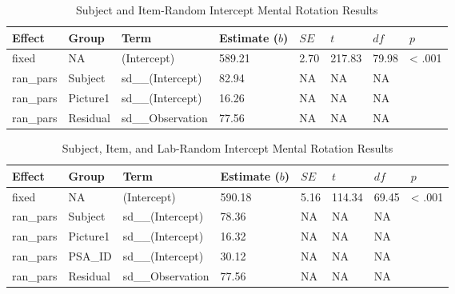 \documentclass[
  man,floatsintext]{apa7}
\begin{document}
\begin{table}[tbp]

\begin{center}
\begin{threeparttable}

\caption{\label{tab:item_e}Subject and Item-Random Intercept Mental Rotation Results}

\begin{tabular}{llllllll}
\toprule
Effect & Group & Term & Estimate ($b$) & $SE$ & $t$ & $df$ & $p$\\
\midrule
fixed & NA & (Intercept) & 589.21 & 2.70 & 217.83 & 79.98 & < .001\\
ran\_pars & Subject & sd\_\_(Intercept) & 82.94 & NA & NA & NA & \\
ran\_pars & Picture1 & sd\_\_(Intercept) & 16.26 & NA & NA & NA & \\
ran\_pars & Residual & sd\_\_Observation & 77.56 & NA & NA & NA & \\
\bottomrule
\end{tabular}

\end{threeparttable}
\end{center}

\end{table}

\begin{table}[tbp]

\begin{center}
\begin{threeparttable}

\caption{\label{tab:lab_e}Subject, Item, and Lab-Random Intercept Mental Rotation Results}

\begin{tabular}{llllllll}
\toprule
Effect & Group & Term & Estimate ($b$) & $SE$ & $t$ & $df$ & $p$\\
\midrule
fixed & NA & (Intercept) & 590.18 & 5.16 & 114.34 & 69.45 & < .001\\
ran\_pars & Subject & sd\_\_(Intercept) & 78.36 & NA & NA & NA & \\
ran\_pars & Picture1 & sd\_\_(Intercept) & 16.32 & NA & NA & NA & \\
ran\_pars & PSA\_ID & sd\_\_(Intercept) & 30.12 & NA & NA & NA & \\
ran\_pars & Residual & sd\_\_Observation & 77.56 & NA & NA & NA & \\
\bottomrule
\end{tabular}

\end{threeparttable}
\end{center}

\end{table}
\end{document}

